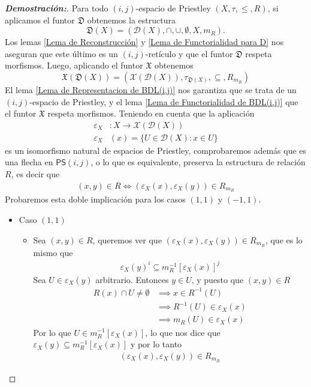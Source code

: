 \documentclass[12pt]{book}
\newcommand{\PS}{\mathsf{PS}}
\newcommand{\D}{\mathfrak{D}}
\begin{document}
\begin{proof}[{\textbf{Demostración:}}]Para todo $(i,j)$-espacio de Priestley $(X,\tau,\leq,R)$, si aplicamos el funtor $\D$ obtenemos la estructura
\[ \D(X)=(\mathcal{D}(X),\cap,\cup,\emptyset,X,m_R). \]
Los lemas \ref{Lema de Reconstrucción} y \ref{Lema de Functorialidad para D} nos aseguran que este último es un $(i,j)$-retículo y que el funtor $\D$ respeta morfismos. Luego, aplicando el funtor $\mathfrak{X}$ obtenemos
\[ \mathfrak{X}(\D(X))=(\mathcal{X}(\mathcal{D}(X)),\tau_{\D(X)},\subseteq,R_{m_R}) \]
El lema \ref{Lema de Representacion de BDL(i,j)} nos garantiza que se trata de un $(i,j)$-espacio de Priestley, y el lema \ref{Lema de Functorialidad de BDL(i,j)} que el funtor $\mathfrak{X}$ respeta morfismos.
Teniendo en cuenta que la aplicación
\begin{align*}
\varepsilon_X&: X \to \mathcal{X}(\mathcal{D}(X))\\
\varepsilon_X&(x)=\{U\in \mathcal{D}(X): x\in U\} \end{align*}
es un isomorfismo natural de espacios de Priestley, comprobaremos además que es una flecha en $\PS(i,j)$, o lo que es equivalente, preserva la estructura de relación $R$, es decir que 
\begin{align*}
    (x,y) \in R\Leftrightarrow(\varepsilon_X(x), \varepsilon_X(y))\in R_{m_R}
\end{align*}
Probaremos  esta doble implicación para los casos $(1,1)$ y $(-1,1)$.

\begin{itemize}
    \item Caso $(1,1)$
\begin{itemize}
\item[$\Rightarrow$)] Sea $(x,y)\in R$, queremos ver que $(\varepsilon_X(x), \varepsilon_X(y))\in R_{m_R}$, que es lo mismo que 
\begin{align*}
    \varepsilon_X(y)^i\subseteq m_R^{-1}[\varepsilon_X(x)]^j
\end{align*}
Sea $U\in \varepsilon_X(y)$ arbitrario. Entonces $y\in U$, y puesto que $(x,y)\in R$
\begin{align*}
    R(x)\cap U\neq\emptyset &\implies x\in R^{-1}(U)\\
    &\implies R^{-1}(U)\in \varepsilon_X(x)\\
    &\implies m_R(U)\in \varepsilon_X(x)
\end{align*}
Por lo que $U\in m_R^{-1}[\varepsilon_X(x)]$, lo que nos dice que $\varepsilon_X(y)\subseteq m_R^{-1}[\varepsilon_X(x)]$ y por lo tanto
\begin{align*}
    (\varepsilon_X(x), \varepsilon_X(y))\in R_{m_R}
\end{align*}


\end{itemize}
\end{itemize}
\end{proof}
\end{document}
